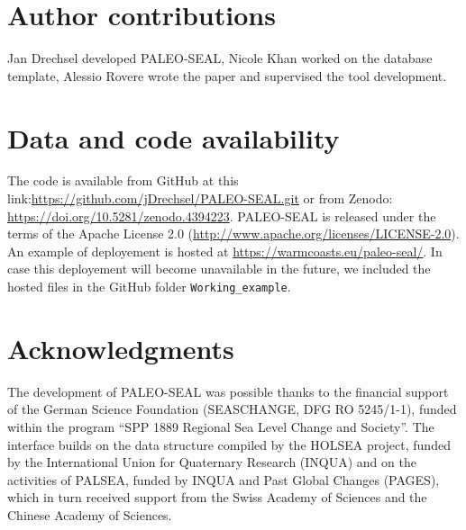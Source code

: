 \documentclass[a4paper,fleqn]{cas-dc}
\begin{document}
\section{Author contributions}
Jan Drechsel developed PALEO-SEAL, Nicole Khan worked on the database template, Alessio Rovere wrote the paper and supervised the tool development. 

\section{Data and code availability}
The code is available from GitHub at this link:\url{https://github.com/jDrechsel/PALEO-SEAL.git} or from Zenodo: \url{https://doi.org/10.5281/zenodo.4394223}. PALEO-SEAL is released under the terms of the Apache License 2.0 (\url{http://www.apache.org/licenses/LICENSE-2.0}). An example of deployement is hosted at \url{https://warmcoasts.eu/paleo-seal/}. In case this deployement will become unavailable in the future, we included the hosted files in the GitHub folder \texttt{Working\_example}.

\section{Acknowledgments}
The development of PALEO-SEAL was possible thanks to the financial support of the German Science Foundation (SEASCHANGE, DFG RO 5245/1-1), funded within the program 
``SPP 1889 Regional Sea Level Change and Society''. The interface builds on the data structure compiled by the HOLSEA project, funded by the International Union for Quaternary Research (INQUA) and on the activities of PALSEA, funded by INQUA and Past Global Changes (PAGES), which in turn received support from the Swiss Academy of Sciences and the Chinese Academy of Sciences.

%



\end{document}
